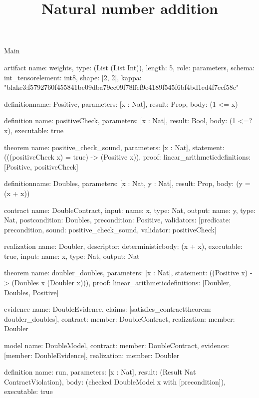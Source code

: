 \begin{lexlean}{Main}
\title{Natural number addition}
\begin{semanticmodule}
artifact{
  name: weights,
  type: (List (List Int)),
  length: 5,
  role: parameters,
  schema: int_tensor{element: int8, shape: [2, 2]},
  kappa: "blake3:f5792760f455841be09dba79ec09f78ffef9e4189f545f6bf4bd1ed4f7eef58e"
}

definition{name: Positive, parameters: [x : Nat], result: Prop, body: (1 <= x)}

definition{
  name: positiveCheck,
  parameters: [x : Nat],
  result: Bool,
  body: (1 <=? x),
  executable: true
}

theorem{
  name: positive_check_sound,
  parameters: [x : Nat],
  statement: (((positiveCheck x) = true) -> (Positive x)),
  proof: linear_arithmetic{definitions: [Positive, positiveCheck]}
}

definition{name: Doubles, parameters: [x : Nat, y : Nat], result: Prop, body: (y = (x + x))}

contract{
  name: DoubleContract,
  input: {name: x, type: Nat},
  output: {name: y, type: Nat},
  postcondition: Doubles,
  precondition: Positive,
  validators: [{predicate: precondition, sound: positive_check_sound, validator: positiveCheck}]
}

realization{
  name: Doubler,
  descriptor: deterministic{body: (x + x)},
  executable: true,
  input: {name: x, type: Nat},
  output: Nat
}

theorem{
  name: doubler_doubles,
  parameters: [x : Nat],
  statement: ((Positive x) -> (Doubles x (Doubler x))),
  proof: linear_arithmetic{definitions: [Doubler, Doubles, Positive]}
}

evidence{
  name: DoubleEvidence,
  claims: [satisfies_contract{theorem: doubler_doubles}],
  contract: {member: DoubleContract},
  realization: {member: Doubler}
}

model{
  name: DoubleModel,
  contract: {member: DoubleContract},
  evidence: [{member: DoubleEvidence}],
  realization: {member: Doubler}
}

definition{
  name: run,
  parameters: [x : Nat],
  result: (Result Nat ContractViolation),
  body: (checked DoubleModel x with [precondition]),
  executable: true
}
\end{semanticmodule}
\end{lexlean}
